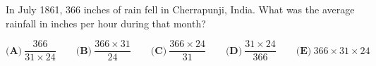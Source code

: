 

In July 1861, $ 366$ inches of rain fell in Cherrapunji, India. What was the average rainfall in inches per hour during that month?

\[ \textbf{(A)}\ \frac{366}{31 \times 24} \qquad
\textbf{(B)}\ \frac{366 \times 31}{24} \qquad
\textbf{(C)}\ \frac{366 \times 24}{31} \qquad
\textbf{(D)}\ \frac{31 \times 24}{366} \qquad
\textbf{(E)}\ 366 \times 31 \times 24
\]